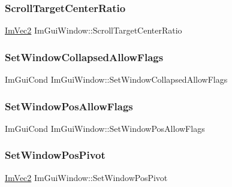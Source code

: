 \subsubsection{\texorpdfstring{Scroll\+Target\+Center\+Ratio}{ScrollTargetCenterRatio}}
{\footnotesize\ttfamily \hyperlink{struct_im_vec2}{Im\+Vec2} Im\+Gui\+Window\+::\+Scroll\+Target\+Center\+Ratio}

\hypertarget{struct_im_gui_window_a48384a3767252325e5c71b534adc58a9}{}\label{struct_im_gui_window_a48384a3767252325e5c71b534adc58a9} 
\subsubsection{\texorpdfstring{Set\+Window\+Collapsed\+Allow\+Flags}{SetWindowCollapsedAllowFlags}}
{\footnotesize\ttfamily Im\+Gui\+Cond Im\+Gui\+Window\+::\+Set\+Window\+Collapsed\+Allow\+Flags}

\hypertarget{struct_im_gui_window_a8ff69a8bdc9221c9cc7d8ba656013d84}{}\label{struct_im_gui_window_a8ff69a8bdc9221c9cc7d8ba656013d84} 
\subsubsection{\texorpdfstring{Set\+Window\+Pos\+Allow\+Flags}{SetWindowPosAllowFlags}}
{\footnotesize\ttfamily Im\+Gui\+Cond Im\+Gui\+Window\+::\+Set\+Window\+Pos\+Allow\+Flags}

\hypertarget{struct_im_gui_window_a4de5608bf44728447327d832fa84f0c9}{}\label{struct_im_gui_window_a4de5608bf44728447327d832fa84f0c9} 
\subsubsection{\texorpdfstring{Set\+Window\+Pos\+Pivot}{SetWindowPosPivot}}
{\footnotesize\ttfamily \hyperlink{struct_im_vec2}{Im\+Vec2} Im\+Gui\+Window\+::\+Set\+Window\+Pos\+Pivot}

\hypertarget{struct_im_gui_window_a6caed47ef8e25a2e7a68a6be72c5716a}{}\label{struct_im_gui_window_a6caed47ef8e25a2e7a68a6be72c5716a} 
